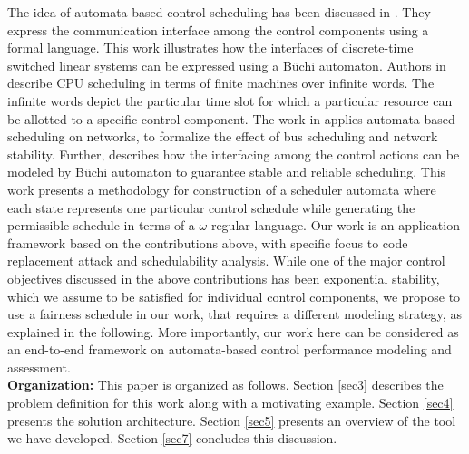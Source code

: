 \noindent
The idea of automata based control scheduling has been discussed in \cite{WeissA07}. They express
the communication interface among the control components using a formal language. This work illustrates how the interfaces of discrete-time switched linear systems
can be expressed using a B\"{u}chi automaton. Authors in \cite{AlurW08}  describe CPU scheduling
in terms of finite machines over infinite words. The infinite words depict the particular time 
slot for which a particular resource can be allotted to a specific control component. The work in \cite{WeissFAA09} applies automata based scheduling on networks, to formalize the effect of bus scheduling and network stability. Further, \cite{GhoshMDHD16} describes how the interfacing among 
the control actions can be modeled by B\"{u}chi automaton to guarantee stable and reliable
scheduling. This work presents a methodology for construction of a scheduler automata 
where each state represents one particular control schedule while generating the permissible 
schedule in terms of a $\omega$-regular language. Our work is an application framework based on the contributions above, with specific focus to code replacement attack and schedulability analysis. While one of the major control objectives discussed in the above contributions has been exponential stability, which we assume to be satisfied for individual control components, we propose to use a fairness schedule in our work, that requires a different modeling strategy, as explained in the following. More importantly, our work here can be considered as an end-to-end framework on automata-based control performance modeling and assessment. \\

\noindent
{\bf Organization:} This paper is organized as follows. Section \ref{sec3} describes the problem definition for this work along with a motivating example. Section \ref{sec4} presents the solution architecture. Section \ref{sec5} presents an overview of the tool we have developed. Section \ref{sec7} concludes this discussion.

